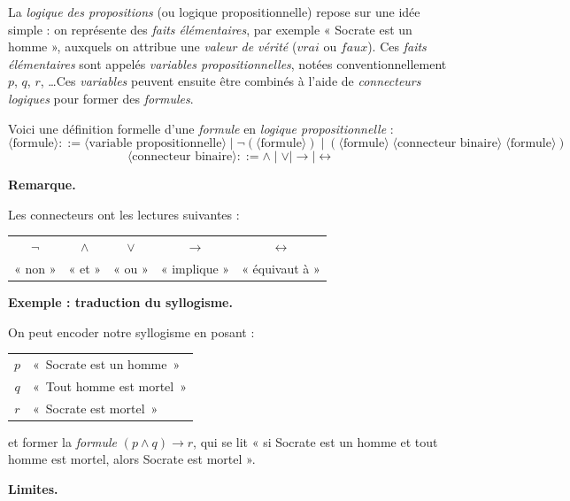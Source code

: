 \documentclass[11pt]{article}
\newenvironment{remarque}{%
    \begin{mdframed}[
        linecolor=sectioncolor!40,
        linewidth=0.8pt,
        backgroundcolor=sectioncolor!5,
        innerleftmargin=10pt,
        innerrightmargin=10pt,
        innertopmargin=6pt,
        innerbottommargin=6pt,
        skipabove=8pt,
        skipbelow=8pt
    ]
    \noindent\textbf{\small\color{sectioncolor}Remarque.}\enspace\small\itshape
}{%
    \end{mdframed}
}
\begin{document}
La \textit{logique des propositions} (ou logique propositionnelle) repose sur une idée simple : on représente des \textit{faits élémentaires}, par exemple « Socrate est un homme », auxquels on attribue une \textit{valeur de vérité} ($vrai$ ou $faux$). Ces \textit{faits élémentaires} sont appelés \textit{variables propositionnelles}, notées conventionnellement $p$, $q$, $r$, \ldots Ces \textit{variables} peuvent ensuite être combinés à l'aide de \textit{connecteurs logiques} pour former des \textit{formules}.

Voici une définition formelle d'une \textit{formule} en \textit{logique propositionnelle} :
\[
\langle\text{formule}\rangle ::= \langle\text{variable propositionnelle}\rangle \mid
\neg(\langle\text{formule}\rangle) \mid
(\langle\text{formule}\rangle\;\langle\text{connecteur binaire}\rangle\;\langle\text{formule}\rangle)
\]
\[
\langle\text{connecteur binaire}\rangle ::= \wedge \mid \vee \mid \rightarrow \mid \leftrightarrow
\]

\begin{remarque}
Les connecteurs ont les lectures suivantes :
\begin{center}
\begin{tabular}{ccccc}
    $\neg$ & $\wedge$ & $\vee$ & $\rightarrow$ & $\leftrightarrow$ \\
    « non » & « et » & « ou » & « implique » & « équivaut à »
\end{tabular}
\end{center}
\end{remarque}


\vspace{0.4cm}
\noindent\textbf{Exemple : traduction du syllogisme.}
\vspace{0.2cm}

On peut encoder notre syllogisme en posant :
\begin{center}
\begin{tabular}{cl}
    $p$ & «~Socrate est un homme~» \\
    $q$ & «~Tout homme est mortel~» \\
    $r$ & «~Socrate est mortel~»
\end{tabular}
\end{center}
et former la \textit{formule} $(p \wedge q) \rightarrow r$, qui se lit « si Socrate est un homme et tout homme est mortel, alors Socrate est mortel ».

\newpage

\vspace{0.4cm}
\noindent\textbf{Limites.}
\vspace{0.2cm}
\end{document}
